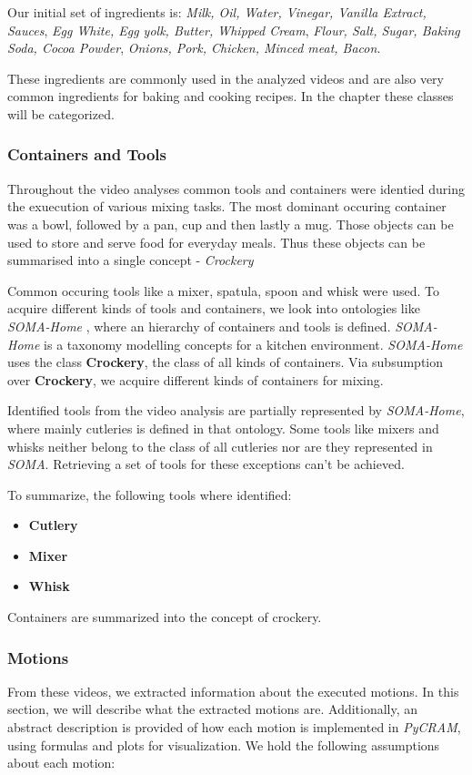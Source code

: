 Our initial set of ingredients is: \textit{Milk, Oil, Water, Vinegar, Vanilla Extract, Sauces}, \textit{Egg White, Egg yolk, Butter, Whipped Cream}, \textit{Flour, Salt, Sugar, Baking Soda, Cocoa Powder},
\textit{Onions, Pork, Chicken, Minced meat, Bacon}.

These ingredients are commonly used in the analyzed videos and are also very common ingredients for baking and cooking recipes.
In the chapter  these classes will be categorized.

\subsubsection{Containers and Tools}
\label{sec:ContainersAndToolsAcquisition}
Throughout the video analyses common tools and containers were identied during the exuecution of various mixing tasks.
The most dominant occuring container was a bowl, followed by a pan, cup and then lastly a mug.
Those objects can be used to store and serve food for everyday meals. Thus these objects can be summarised 
into a single concept - \textit{Crockery} \cite{crockery}

Common occuring tools like a mixer, spatula, spoon and whisk were used. 
To acquire different kinds of tools and containers, we look into ontologies like \textit{SOMA-Home} \cite{soma},
where an hierarchy of containers and tools is defined. \textit{SOMA-Home} is a taxonomy modelling concepts for a kitchen environment. 
\textit{SOMA-Home} uses the class \textbf{Crockery}, the class of all kinds of containers.
Via subsumption over \textbf{Crockery}, we acquire different kinds of containers for mixing.

Identified tools from the video analysis are partially represented by \textit{SOMA-Home}, where mainly cutleries is defined in that ontology.
Some tools like mixers and whisks neither belong to the class of all cutleries nor are they represented in \textit{SOMA}. Retrieving a set of tools
for these exceptions can't be achieved.

To summarize, the following tools where identified: 
\begin{itemize}
  \item \textbf{Cutlery}
  \item \textbf{Mixer}
  \item \textbf{Whisk}
\end{itemize}

Containers are summarized into the concept of crockery. 
\subsubsection{Motions}
\label{sec:Motions}
From these videos, we extracted information about the executed motions. In this section, we will describe what the extracted motions are. 
Additionally, an abstract description is provided of how each motion is implemented in \textit{PyCRAM}, using formulas and plots for visualization.
We hold the following assumptions about each motion:

